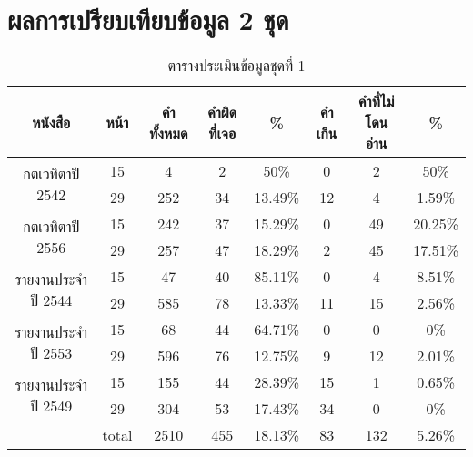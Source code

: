 \section{ผลการเปรียบเทียบข้อมูล 2 ชุด}

\begin{table}[H]
    \caption{ตารางประเมินข้อมูลชุดที่ 1}\label{tbl:bigdata}
        \begin{tabular}{|c|c|c|c|c|c|c|c|}
            \hline
            หนังสือ                             & หน้า  & คำทั้งหมด & คำผิดที่เจอ & \%    & คำเกิน & คำที่ไม่โดนอ่าน & \%    \\ \hline
            \multirow{2}{*}{กตเวทิตาปี 2542}    & 15    & 4         & 2           & 50\%    & 0      & 2               & 50\%    \\ \cline{2-8} 
                                                & 29    & 252       & 34          & 13.49\% & 12     & 4               & 1.59\%  \\ \hline
            \multirow{2}{*}{กตเวทิตาปี 2556}    & 15    & 242       & 37          & 15.29\% & 0      & 49              & 20.25\% \\ \cline{2-8} 
                                                & 29    & 257       & 47          & 18.29\% & 2      & 45              & 17.51\% \\ \hline
            \multirow{2}{*}{รายงานประจำปี 2544} & 15    & 47        & 40          & 85.11\% & 0      & 4               & 8.51\%  \\ \cline{2-8} 
                                                & 29    & 585       & 78          & 13.33\% & 11     & 15              & 2.56\%  \\ \hline
            \multirow{2}{*}{รายงานประจำปี 2553} & 15    & 68        & 44          & 64.71\% & 0      & 0               & 0\%     \\ \cline{2-8} 
                                                & 29    & 596       & 76          & 12.75\% & 9      & 12              & 2.01\%  \\ \hline
            \multirow{2}{*}{รายงานประจำปี 2549} & 15    & 155       & 44          & 28.39\% & 15     & 1               & 0.65\%  \\ \cline{2-8} 
                                                & 29    & 304       & 53          & 17.43\% & 34     & 0               & 0\%     \\ \hline
                                                & total & 2510      & 455         & 18.13\% & 83     & 132             & 5.26\%  \\ \hline
            \end{tabular}
            \end{table}

